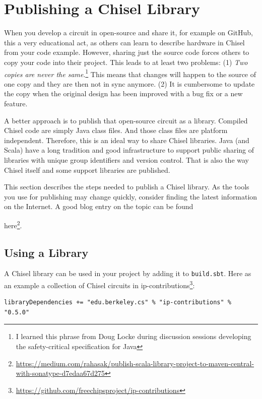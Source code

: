 \documentclass[%
    10pt,
    headinclude, footexclude,
    openright, %
    notitlepage,
    cleardoubleempty,
    headsepline,
    pointlessnumbers,
    bibtotoc, idxtotoc,
    ]{scrbook}
\newif\ifbook
\newcommand{\code}[1]{{\lstinline[basicstyle=\small\ttfamily]{#1}}}
\newcommand{\myref}[2]{\href{#1}{#2}}
\renewcommand{\myref}[2]{{#2}{\footnote{\url{#1}}}}
\begin{document}
\section{Publishing a Chisel Library}

When you develop a circuit in open-source and share it, for example on GitHub,
this a very educational act, as others can learn to describe hardware in Chisel from your code example.
However, sharing just the source code forces others to copy your code into their
project. This leads to at least two problems: (1) \emph{Two copies are never the
same}.\footnote{I learned this phrase from Doug Locke during discussion sessions
developing the safety-critical specification for Java} This means that changes will
happen to the source of one copy and they are then not in sync anymore.
(2) It is cumbersome to update the copy when the original design has been improved
with a bug fix or a new feature.

A better approach is to publish that open-source circuit as a library.
Compiled Chisel code are simply Java class files. And those class files are
platform independent. Therefore, this is an ideal way to share Chisel libraries.
Java (and Scala) have a long tradition and good infrastructure to support
public sharing of libraries with unique group identifiers and version control.
That is also the way Chisel itself and some support libraries are published.

This section describes the steps needed to publish a Chisel library. As the tools you
use for publishing may change quickly, consider finding the latest information on the
Internet. A good blog entry on the topic can be found
\ifbook
\myref{https://medium.com/rahasak/}{here}.
\else
\myref{https://medium.com/rahasak/publish-scala-library-project-to-maven-central-with-sonatype-d7edaa67d275}{here}.
\fi

\subsection{Using a Library}

A Chisel library can be used in your project by adding it to \code{build.sbt}. Here as an
example a collection of Chisel circuits in \myref{https://github.com/freechipsproject/ip-contributions}{ip-contributions}:

\begin{verbatim}
libraryDependencies += "edu.berkeley.cs" % "ip-contributions" % "0.5.0"
\end{verbatim}
\end{document}
